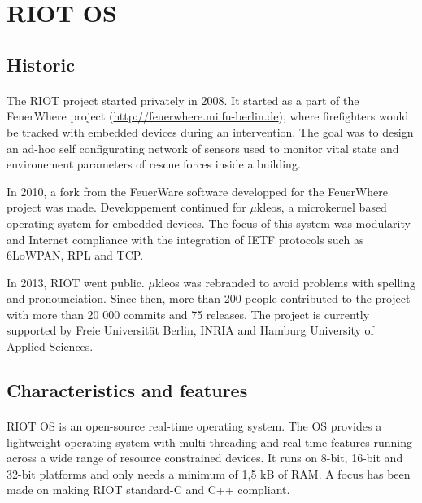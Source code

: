 \section{RIOT OS}

\subsection{Historic}
\paragraph{}
The RIOT project started privately in 2008.
It started as a part of the FeuerWhere project (\url{http://feuerwhere.mi.fu-berlin.de}), 
    where firefighters would be tracked with embedded devices during an intervention.
The goal was to design an ad-hoc self configurating network of sensors used 
    to monitor vital state and environement parameters of rescue forces inside a building.

In 2010, a fork from the FeuerWare software developped for the FeuerWhere project was made.
Developpement continued for $\mu$kleos, a microkernel based operating system for embedded devices.
The focus of this system was modularity and Internet compliance with the integration of IETF protocols such as 6LoWPAN, RPL and TCP.

In 2013, RIOT went public.
$\mu$kleos was rebranded to avoid problems with spelling and pronounciation.
Since then, more than 200 people contributed to the project with more than 20 000 commits and 75 releases.
The project is currently supported by Freie Universität Berlin, INRIA and Hamburg University of Applied Sciences.

\subsection{Characteristics and features}
\paragraph{}
RIOT OS is an open-source real-time operating system.
The OS provides a lightweight operating system with multi-threading and real-time features running across a wide range of resource constrained devices.
It runs on 8-bit, 16-bit and 32-bit platforms and only needs a minimum of 1,5 kB of RAM.
A focus has been made on making RIOT standard-C and C++ compliant.

